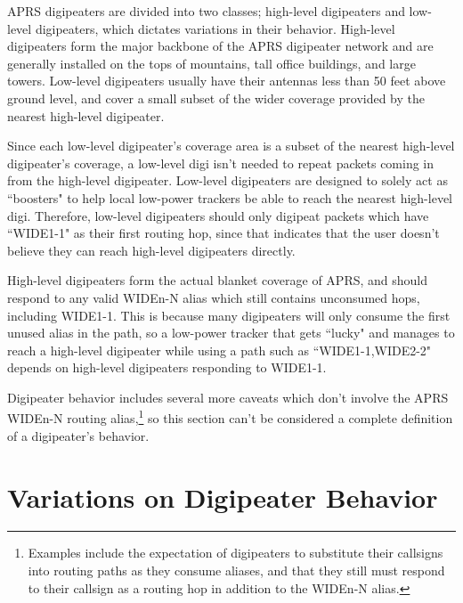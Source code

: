 APRS digipeaters are divided into two classes; high-level digipeaters and
low-level digipeaters, which dictates variations in their behavior.
High-level digipeaters form the major backbone of the APRS digipeater network
and are generally installed on the tops of mountains,
tall office buildings, and large towers.
Low-level digipeaters usually have their antennas less than 50 feet above ground
level, and cover a small subset of the wider coverage provided by the
nearest high-level digipeater.

Since each low-level digipeater's coverage area is a subset of the
nearest high-level digipeater's coverage, a low-level digi isn't needed
to repeat packets coming in from the high-level digipeater.
Low-level digipeaters are designed to solely act as ``boosters" to
help local low-power trackers be able to reach the nearest high-level digi.
Therefore, low-level digipeaters should only digipeat packets which
have ``WIDE1-1" as their first routing hop, since that indicates that
the user doesn't believe they can reach high-level digipeaters directly.

High-level digipeaters form the actual blanket coverage of APRS, and
should respond to any valid WIDEn-N alias which still contains unconsumed hops,
including WIDE1-1. This is because many digipeaters will only consume the first
unused alias in the path, so a low-power tracker that gets ``lucky" and manages to
reach a high-level digipeater while using a path such as ``WIDE1-1,WIDE2-2"
depends on high-level digipeaters responding to WIDE1-1.

Digipeater behavior includes several more caveats which don't involve the APRS
WIDEn-N routing alias,\footnote{Examples include the expectation of digipeaters
	to substitute their callsigns into routing paths as they consume aliases,
	and that they still must respond to their callsign as a routing hop in 
addition to the WIDEn-N alias.} 
so this section can't be considered a complete definition of a digipeater's behavior.

\section{Variations on Digipeater Behavior}

